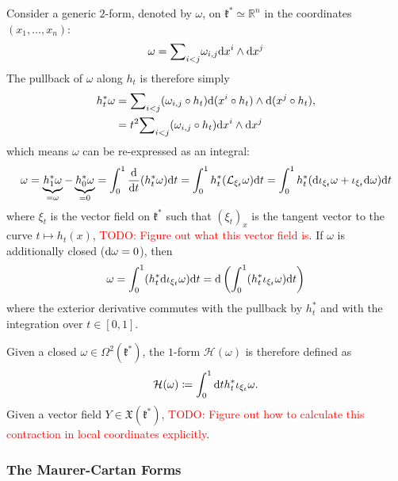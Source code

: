 \documentclass[notitlepage]{article}
\begin{document}
Consider a generic $2$-form, denoted by $\omega$, on $\mathfrak k^{*} \simeq \mathbb R^{n}$ in the coordinates $(x_1, \ldots, x_n)$:
\begin{equation}
    \omega = {\sum}_{i<j} \omega_{i,j} \mathrm{d} x^{i} \wedge \mathrm{d} x^{j}
\end{equation}
The pullback of $\omega$ along $h_t$ is therefore simply
\begin{align}
    h_t^{*} \omega 
    &= {\sum}_{i<j} (\omega_{i,j} \circ h_t) \mathrm{d} (x^{i}\circ h_t) \wedge \mathrm{d} (x^{j}\circ h_t), \\
    &= t^2 {\sum}_{i<j} (\omega_{i,j} \circ h_t) \mathrm{d} x^{i} \wedge \mathrm{d} x^{j}
\end{align}
which means $\omega$ can be re-expressed as an integral:
\begin{align}
    \omega 
    = \underbrace{h_1^{*} \omega}_{=\omega} - \underbrace{h_0^{*}\omega}_{=0}
    = \int_{0}^{1} \frac{\mathrm{d}}{\mathrm{d} t} (h_t^{*} \omega) \mathrm{d} t
    = \int_{0}^{1} h_t^{*} (\mathcal L_{\xi_t} \omega) \mathrm{d} t
    = \int_{0}^{1} h_t^{*} (\mathrm{d} \iota_{\xi_{t}} \omega + \iota_{\xi_{t}} \mathrm{d} \omega) \mathrm{d} t
\end{align}
where $\xi_t$ is the vector field on $\mathfrak k^{*}$ such that $(\xi_t)_x$ is the tangent vector to the curve $t \mapsto h_t(x)$, \textcolor{red}{TODO: Figure out what this vector field is}.
If $\omega$ is additionally closed ($\mathrm{d} \omega = 0$), then
\begin{align}
    \omega 
    = \int_{0}^{1} (h_t^{*} \mathrm{d} \iota_{\xi_{t}} \omega) \mathrm{d} t
    = \mathrm{d} \left(\int_{0}^{1} (h_t^{*} \iota_{\xi_{t}} \omega) \mathrm{d} t\right)
\end{align}
where the exterior derivative commutes with the pullback by $h_t^{*}$ and with the integration over $t \in [0,1]$.

Given a closed $\omega \in \Omega^{2}(\mathfrak k^{*})$, the $1$-form $\mathcal H(\omega)$ is therefore defined as
\begin{equation}
    \mathcal H(\omega) \coloneqq \int_{0}^{1} \mathrm{d} t h_{t}^{*} \iota_{\xi_{t}} \omega.
\end{equation}
Given a vector field $Y \in \mathfrak{X}(\mathfrak k^{*})$, \textcolor{red}{TODO: Figure out how to calculate this contraction in local coordinates explicitly}.

\subsubsection{The Maurer-Cartan Forms}
\end{document}
